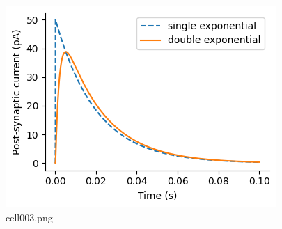 \begin{figure}[ht]
	\centering
	\includegraphics[scale=0.8, max width=\linewidth]{./fig/synapse-model/expo-synapse/cell003.png}
	\caption{cell003.png}
	\label{cell003.png}
\end{figure}